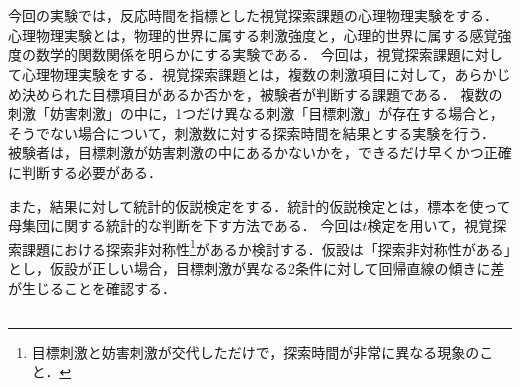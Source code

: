 \chapter{\kadaib}
\section{\purpose}
今回の実験では，反応時間を指標とした視覚探索課題の心理物理実験をする．
心理物理実験とは，物理的世界に属する刺激強度と，心理的世界に属する感覚強度の数学的関数関係を明らかにする実験である\cite{心理物理測定法}．
今回は，視覚探索課題に対して心理物理実験をする．視覚探索課題とは，複数の刺激項目に対して，あらかじめ決められた目標項目があるか否かを，被験者が判断する課題である\cite{視覚探索}．
複数の刺激「妨害刺激」の中に，1つだけ異なる刺激「目標刺激」が存在する場合と，そうでない場合について，刺激数に対する探索時間を結果とする実験を行う．
被験者は，目標刺激が妨害刺激の中にあるかないかを，できるだけ早くかつ正確に判断する必要がある．\par
また，結果に対して統計的仮説検定をする．統計的仮説検定とは，標本を使って母集団に関する統計的な判断を下す方法である\cite[p.200]{Pythonで学ぶあたらしい統計学の教科書}．
今回は\(t\)検定を用いて，視覚探索課題における探索非対称性\footnote{目標刺激と妨害刺激が交代しただけで，探索時間が非常に異なる現象のこと\cite{4視覚探索}．}があるか検討する．仮設は「探索非対称性がある」とし，仮設が正しい場合，目標刺激が異なる2条件に対して回帰直線の傾きに差が生じることを確認する．
\section{\method}

